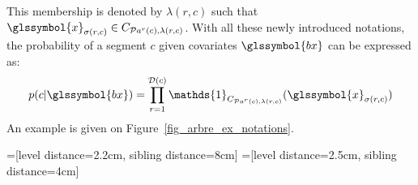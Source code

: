 This membership is denoted by $\lambda(r,c)$ such that $\glssymbol{x}_{\sigma(r,c)} \in C_{\mathcal{P}a^r(c),\lambda(r,c)}$.
With all these newly introduced notations, the probability of a segment $c$ given covariates $\glssymbol{bx}$ can be expressed as:
\begin{equation} \label{eq:tree}
p( c | \glssymbol{bx}) = \prod_{r = 1}^{\mathcal{D}(c)} \mathds{1}_{C_{\mathcal{P}a^r(c),\lambda(r,c)}} (\glssymbol{x}_{\sigma(r,c)})
\end{equation}
An example is given on Figure~\ref{fig_arbre_ex_notations}.

=[level distance=2.2cm, sibling distance=8cm]
=[level distance=2.5cm, sibling distance=4cm]


